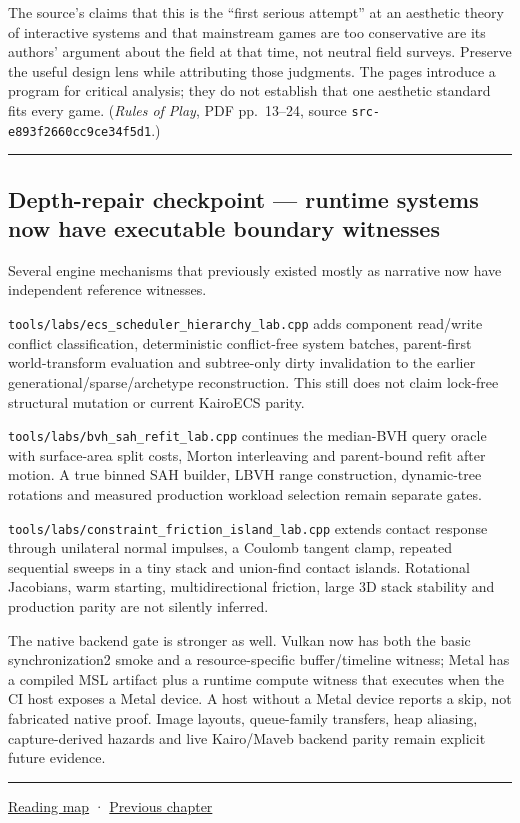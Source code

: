The source's claims that this is the ``first serious attempt'' at an aesthetic theory of interactive systems and that mainstream games are too conservative are its authors' argument about the field at that time, not neutral field surveys. Preserve the useful design lens while attributing those judgments. The pages introduce a program for critical analysis; they do not establish that one aesthetic standard fits every game. (\emph{Rules of Play}, PDF pp.~13--24, source \texttt{src-e893f2660cc9ce34f5d1}.)

\begin{center}\rule{0.5\linewidth}{0.5pt}\end{center}

\subsection{Depth-repair checkpoint --- runtime systems now have executable boundary witnesses}\label{depth-repair-checkpoint-runtime-systems-now-have-executable-boundary-witnesses}

Several engine mechanisms that previously existed mostly as narrative now have independent reference witnesses.

\texttt{tools/labs/ecs\_scheduler\_hierarchy\_lab.cpp} adds component read/write conflict classification, deterministic conflict-free system batches, parent-first world-transform evaluation and subtree-only dirty invalidation to the earlier generational/sparse/archetype reconstruction. This still does not claim lock-free structural mutation or current KairoECS parity.

\texttt{tools/labs/bvh\_sah\_refit\_lab.cpp} continues the median-BVH query oracle with surface-area split costs, Morton interleaving and parent-bound refit after motion. A true binned SAH builder, LBVH range construction, dynamic-tree rotations and measured production workload selection remain separate gates.

\texttt{tools/labs/constraint\_friction\_island\_lab.cpp} extends contact response through unilateral normal impulses, a Coulomb tangent clamp, repeated sequential sweeps in a tiny stack and union-find contact islands. Rotational Jacobians, warm starting, multidirectional friction, large 3D stack stability and production parity are not silently inferred.

The native backend gate is stronger as well. Vulkan now has both the basic synchronization2 smoke and a resource-specific buffer/timeline witness; Metal has a compiled MSL artifact plus a runtime compute witness that executes when the CI host exposes a Metal device. A host without a Metal device reports a skip, not fabricated native proof. Image layouts, queue-family transfers, heap aliasing, capture-derived hazards and live Kairo/Maveb backend parity remain explicit future evidence.

\begin{center}\rule{0.5\linewidth}{0.5pt}\end{center}

\href{Chapter\%20Edition/03\%20-\%20Game\%20Engine/00\%20-\%20Reading\%20Map}{Reading map} · \hyperref[06-engine-ii-ch046]{Previous chapter}
